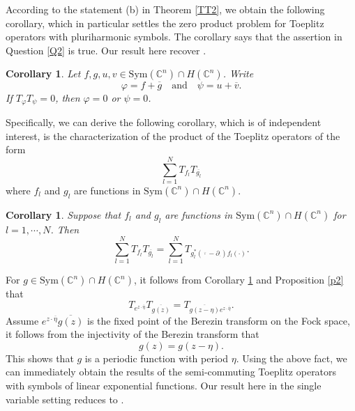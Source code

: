 \documentclass[11pt,reqno]{amsart}
\newtheorem{cor}[theorem]{Corollary}
\theoremstyle{definition}
\begin{document}
%
According to the statement (b) in Theorem \ref{TT2}, we obtain the following corollary, which in particular settles the zero product problem for Toeplitz operators with pluriharmonic symbols. The corollary says that the assertion in Question \ref{Q2} is true.  Our result here recover \cite[Theorem 4.2]{Bauer}.
\begin{cor}\label{c3}
Let $f,g,u,v\in \mathrm{Sym}(\mathbb{C}^n)\cap H(\mathbb{C}^n)$. Write
$$\varphi=f+\overline{g}\quad\text{and}\quad\psi=u+\overline{v}.$$ If $T_\varphi T_\psi=0$, then
$\varphi=0$ or $\psi=0$.
\end{cor}

Specifically, we can derive the following corollary, which is of independent interest, is the characterization of the product of the Toeplitz operators of the form
$$\sum_{l=1}^NT_{f_l} T_{\overline{g_l}}$$ where $f_l$ and $g_l$ are functions in $\mathrm{Sym}(\mathbb{C}^n)\cap H(\mathbb{C}^n)$.
\begin{cor}\label{c2}
Suppose that $f_l$ and $g_l$ are functions in $\mathrm{Sym}(\mathbb{C}^n)\cap H(\mathbb{C}^n)$ for $l=1,\cdots,N$. Then
$$\sum_{l=1}^NT_{f_l} T_{\overline{g_l}}=\sum_{l=1}^N T_{g_l^*({\overline{\cdot}}-\partial_\cdot) f_l(\cdot)}.$$
\end{cor}

For $g\in \mathrm{Sym}(\mathbb{C}^n)\cap H(\mathbb{C}^n)$,  it follows from Corollary \ref{c2} and Proposition \ref{p2} that
\begin{equation*}
T_{e^{z\cdot \overline{\eta}}}T_{\overline{g(z)}}=T_{\overline{g(z-\eta)}e^{z\cdot \overline{\eta}}}.
\end{equation*}
Assume $e^{z\cdot \overline{\eta}}\overline{g(z)}$ is the fixed point of the Berezin transform on the Fock space,
it follows from the  injectivity of the Berezin transform  that
$$g(z)=g(z-\eta).$$
This shows that $g$ is a  periodic function with period $\eta.$
Using the above fact, we can immediately obtain the results of the semi-commuting Toeplitz operators with symbols of linear exponential functions. Our result here in the single variable setting reduces to \cite[Section 4-5]{MA}.



\end{document}

